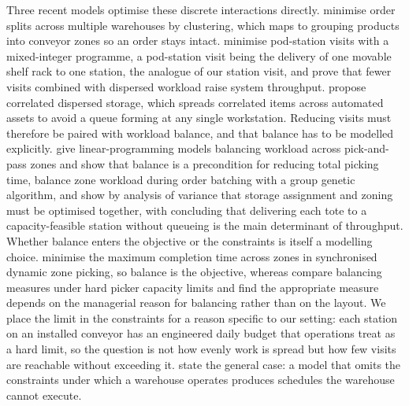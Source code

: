 \documentclass[]{interact}
\begin{document}
Three recent models optimise these discrete interactions directly. \citet{zhu2021} minimise order splits across multiple warehouses by clustering, which maps to grouping products into conveyor zones so an order stays intact. \citet{xie2021} minimise pod-station visits with a mixed-integer programme, a pod-station visit being the delivery of one movable shelf rack to one station, the analogue of our station visit, and prove that fewer visits combined with dispersed workload raise system throughput. \citet{mirzaei2021} propose correlated dispersed storage, which spreads correlated items across automated assets to avoid a queue forming at any single workstation. Reducing visits must therefore be paired with workload balance, and that balance has to be modelled explicitly. \citet{tarczynski2023} give linear-programming models balancing workload across pick-and-pass zones and show that balance is a precondition for reducing total picking time, \citet{pan2015} balance zone workload during order batching with a group genetic algorithm, and \citet{vanGils2018} show by analysis of variance that storage assignment and zoning must be optimised together, with \citet{boysen2023} concluding that delivering each tote to a capacity-feasible station without queueing is the main determinant of throughput. Whether balance enters the objective or the constraints is itself a modelling choice. \citet{saylam2023minmax} minimise the maximum completion time across zones in synchronised dynamic zone picking, so balance is the objective, whereas \citet{vanheusden2022workload} compare balancing measures under hard picker capacity limits and find the appropriate measure depends on the managerial reason for balancing rather than on the layout. We place the limit in the constraints for a reason specific to our setting: each station on an installed conveyor has an engineered daily budget that operations treat as a hard limit, so the question is not how evenly work is spread but how few visits are reachable without exceeding it. \citet{vanheusden2023practical} state the general case: a model that omits the constraints under which a warehouse operates produces schedules the warehouse cannot execute.
\end{document}
